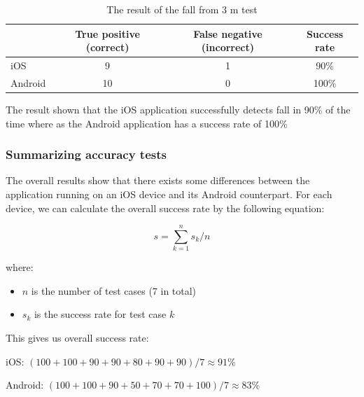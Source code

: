 \documentclass[12pt, a4paper, onecolumn]{article}
\begin{document}
	\begin{table}[H]
		\centering
		\begin{tabular}{|l|c|c|c|}
			\hline
			& True positive (correct) & False negative (incorrect) & Success rate \\ \hline
			iOS     & 9            & 1             & 90\%        \\ \hline
			Android & 10           & 0             & 100\%        \\ \hline
		\end{tabular}
		\caption{The result of the fall from 3 m test}
		\label{table:fall-from-3m}
	\end{table}
	
	The result shown that the iOS application successfully detects fall in 90\% of the time where as the Android application has a success rate of 100\%
	
	\newpage
	
	\subsubsection{Summarizing accuracy tests}
	The overall results show that there exists some differences between the application running on an iOS device and its Android counterpart. For each device, we can calculate the overall success rate by the following equation:
	
	\begin{equation}
	\label{equation:overall-success}
	s = \sum_{k=1}^{n} s_{k} / n
	\end{equation}
	
	where:
	\begin{itemize}
		\item $n$ is the number of test cases (7 in total)
		\item  $s_{k}$ is the success rate for test case $k$
	\end{itemize}
	
	
	This gives us overall success rate: 
	
	iOS: $(100 + 100 + 90 + 90 + 80 + 90 + 90) / 7 ≈ 91\%$
	
	
	Android: $(100 +100 +90 +50 +70  + 70 + 100) / 7 ≈ 83\%$
	
\end{document}
